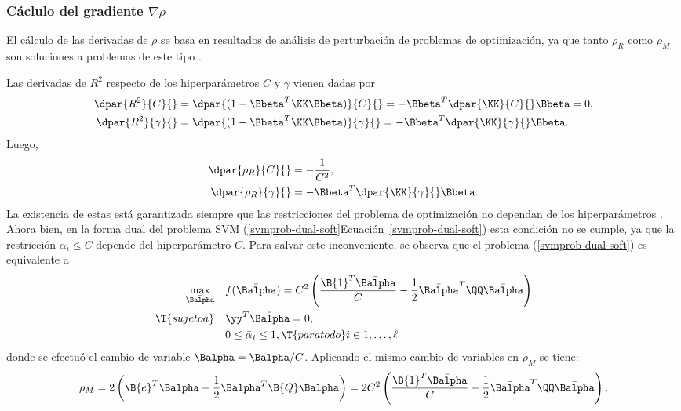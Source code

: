 %
\subsubsection{Cáclulo del gradiente $\nabla\rho$}
%
El cálculo de las derivadas de $\rho$ se basa en resultados de
análisis de perturbación de problemas de optimización, ya que tanto
$\rho_R$ como $\rho_M$ son soluciones a problemas de este tipo
\cite{chung}.

Las derivadas de $R^2$ respecto de los hiperparámetros $C$ y $\gamma$
vienen dadas por
%
\begin{align}
  \dpar{R^2}{C}{} &= \dpar{(1-\Bbeta^T\KK\Bbeta)}{C}{}
  = -\Bbeta^T \dpar{\KK}{C}{}\Bbeta = 0, \\
  \dpar{R^2}{\gamma}{} &= \dpar{(1-\Bbeta^T\KK\Bbeta)}{\gamma}{}
  = -\Bbeta^T \dpar{\KK}{\gamma}{}\Bbeta.
\end{align}
%
Luego,
%
\begin{align}
  \dpar{\rho_R}{C}{} &= -\frac{1}{C^2}, \\
  \dpar{\rho_R}{\gamma}{} &= -\Bbeta^T \dpar{\KK}{\gamma}{}\Bbeta.
\end{align}
%
La existencia de estas está garantizada siempre que las restricciones
del problema de optimización no dependan de los hiperparámetros
\cite{chung}.
Ahora bien, en la forma dual del problema SVM
(\iflatexml\autoref{svmprob-dual-soft}\else{}Ecuación~\ref{svmprob-dual-soft}\fi)
esta condición no se cumple, ya que la restricción $\alpha_i\leq{}C$
depende del hiperparámetro $C$.
Para salvar este inconveniente, se observa que el problema
(\ref{svmprob-dual-soft}) es equivalente a
%
\begin{align}
\begin{split}
    \max_{\bar{\Balpha}}\quad&
    f(\bar{\Balpha}) = C^2 \left( \frac{\B{1}^T\bar{\Balpha}}{C}
    -\frac{1}{2}\bar{\Balpha}^T\QQ\bar{\Balpha}\right)\\
    \T{sujeto a}\quad & \yy^T\bar{\Balpha} = 0, \\
    & 0\leq\bar{\alpha}_i\leq 1,
    \T{ para todo } i\in {1,\ldots,\ell }
\end{split}
\end{align}
%
donde se efectuó el cambio de variable $\bar{\Balpha}=\Balpha/C$.
Aplicando el mismo cambio de variables en $\rho_M$ se tiene:
%
\begin{align}
  \label{eq:rmb-alpha-equiv}
  \rho_M=2\left(\B{e}^T\Balpha-\frac{1}{2}\Balpha^T\B{Q}\Balpha\right)
  = 2C^2\left(\frac{\B{1}^T\bar{\Balpha}}{C} -
  \frac{1}{2}\bar{\Balpha}^T\QQ\bar{\Balpha}\right).
\end{align}
